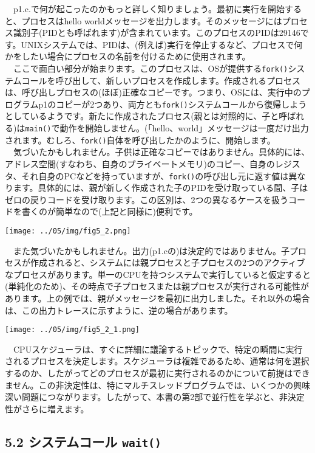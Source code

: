 　p1.c.で何が起こったのかもっと詳しく知りましょう。最初に実行を開始すると、プロセスはhello
worldメッセージを出力します。そのメッセージにはプロセス識別子(PIDとも呼ばれます)が含まれています。このプロセスのPIDは29146です。UNIXシステムでは、PIDは、(例えば)実行を停止するなど、プロセスで何かをしたい場合にプロセスの名前を付けるために使用されます。\\
　ここで面白い部分が始まります。このプロセスは、OSが提供する\texttt{fork()}システムコールを呼び出して、新しいプロセスを作成します。作成されるプロセスは、呼び出しプロセスの(ほぼ)正確なコピーです。つまり、OSには、実行中のプログラムp1のコピーが2つあり、両方とも\texttt{fork()}システムコールから復帰しようとしているようです。新たに作成されたプロセス(親とは対照的に、子と呼ばれる)は\texttt{main()}で動作を開始しません。(「hello、world」メッセージは一度だけ出力されます。むしろ、\texttt{fork()}自体を呼び出したかのように、開始します。\\
　気づいたかもしれません。子供は正確なコピーではありません。具体的には、アドレス空間(すなわち、自身のプライベートメモリ)のコピー、自身のレジスタ、それ自身のPCなどを持っていますが、\texttt{fork()}の呼び出し元に返す値は異なります。具体的には、親が新しく作成された子のPIDを受け取っている間、子はゼロの戻りコードを受け取ります。この区別は、2つの異なるケースを扱うコードを書くのが簡単なので(上記と同様に)便利です。

\texttt{[image: ../05/img/fig5\_2.png]}

　また気づいたかもしれません。出力(p1.cの)は決定的ではありません。子プロセスが作成されると、システムには親プロセスと子プロセスの2つのアクティブなプロセスがあります。単一のCPUを持つシステムで実行していると仮定すると(単純化のため)、その時点で子プロセスまたは親プロセスが実行される可能性があります。上の例では、親がメッセージを最初に出力しました。それ以外の場合は、この出力トレースに示すように、逆の場合があります。

\texttt{[image: ../05/img/fig5\_2\_1.png]}

　CPUスケジューラは、すぐに詳細に議論するトピックで、特定の瞬間に実行されるプロセスを決定します。スケジューラは複雑であるため、通常は何を選択するのか、したがってどのプロセスが最初に実行されるのかについて前提はできません。この非決定性は、特にマルチスレッドプログラムでは、いくつかの興味深い問題につながります。したがって、本書の第2部で並行性を学ぶと、非決定性がさらに増えます。

\hypertarget{ux30b7ux30b9ux30c6ux30e0ux30b3ux30fcux30eb-wait}{%
\subsection*{\texorpdfstring{5.2 システムコール
\texttt{wait()}}{5.2 システムコール wait()}}\label{ux30b7ux30b9ux30c6ux30e0ux30b3ux30fcux30eb-wait}}

